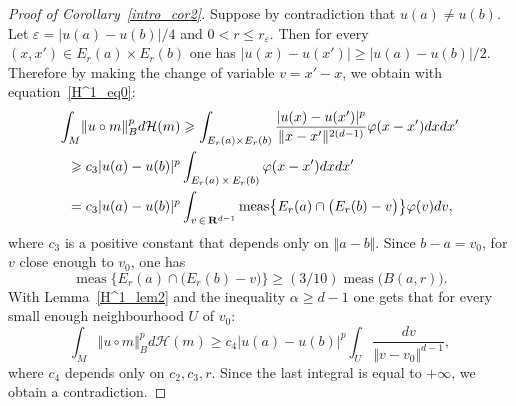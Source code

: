 \documentclass[11pt]{article}
\theoremstyle{definition}
\numberwithin{equation}{section}
\numberwithin{figure}{section}
\numberwithin{table}{section}
\DeclareMathOperator{\meas}{meas}
\begin{document}
\begin{proof}[Proof of Corollary~\ref{intro_cor2}]
Suppose by contradiction that $u(a) \neq u(b)$. Let $\varepsilon = \vert u(a) - u(b) \vert /4$ and $0<r \leqslant r_\varepsilon$. Then for every $(x,x') \in E_r (a) \times E_r (b)$ one has $\vert u(x) - u(x') \vert \geqslant \vert u(a) - u(b) \vert /2$. Therefore by making the change of variable $v = x' -x$, we obtain with equation~\ref{H^1_eq0}:
\begin{multline*}
\int _M \!\Vert u \circ m \Vert _B ^p d\mathcal H (m) \geqslant
\int _{E_r (a) \times E_r (b)} \frac{\vert u(x) - u(x') \vert ^p}{\Vert x-x' \Vert ^{2(d-1)}}
\varphi (x-x') dxdx'\\
\begin{aligned}
&\geqslant c_3 \vert u(a) - u(b) \vert ^p \int _{E_r (a)\,\times\,E_r (b)} \varphi (x-x') dxdx'\\
&= c_3 \vert u(a) - u(b) \vert ^p \int _{v \,\in\,{\bf R} ^{d-1}} \meas\bigl\{E_r (a) \cap \bigl(E_r (b) -v \bigr)\bigr\}
\varphi (v) dv,
\end{aligned}
\end{multline*}
where $c_3$ is a positive constant that depends only on $\Vert a - b \Vert$. Since $b-a = v_0$, for $v$ close enough to $v_0$, one has
\[
\meas\bigl\{E_r (a) \cap \bigl(E_r (b) -v\bigr)\bigr\} \geqslant (3/10) \meas\bigl(B(a, r)\bigr).
\]
With Lemma~\ref{H^1_lem2} and the inequality $\alpha \geqslant d-1$ one gets that for every small enough neighbourhood $U$ of $v_0$:
\[
\int _M \!\Vert u \circ m \Vert _B ^p d\mathcal H (m) \geqslant
c_4 \vert u(a) - u(b) \vert ^p \int _{U} \frac{dv}{\Vert v-v_0 \Vert ^{d-1}},
\]
where $c_4$ depends only on $c_2, c_3, r$. Since the last integral is equal to $+\infty$, we obtain a contradiction.
\end{proof}


\end{document}
